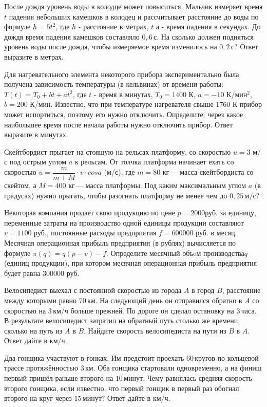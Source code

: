 \begin{listofex}
	\item После дождя уровень воды в колодце может повыситься. Мальчик измеряет время \( t \) падения небольших камешков в колодец и рассчитывает расстояние до воды по формуле \( h=5t^2 \), где \( h \) - расстояние в метрах, \( t \) а - время падения в секундах. До дождя время падения камешков составляло \( 0,6 \) с. На сколько должен подняться уровень воды после дождя, чтобы измеряемое время изменилось на \( 0,2 \) с? Ответ выразите в метрах.
	\item Для нагревательного элемента некоторого прибора экспериментально была получена зависимость температуры (в кельвинах) от времени работы: \( T(t) = T_0 + bt + at^2 \), где \( t \) - время в минутах, \( T_0 = 1400 \) К, \( a = -10 \) К/мин$^{2}$, \( b = 200 \) К/мин. Известно, что при температуре нагревателя свыше \( 1760 \) К прибор может испортиться, поэтому его нужно отключить. Определите, через какое наибольшее время после начала работы нужно отключить прибор. Ответ выразите в минутах.
	\item Скейтбордист прыгает на стоящую на рельсах платформу, со скоростью \(u = 3\)  м/с под острым углом \(a\) к рельсам. От толчка платформа начинает ехать со скоростью \(u = \dfrac{m}{m+M}\cdot v\cdot cos{a}\)  (м/с), где \(m = 80\) кг — масса скейтбордиста со скейтом, а \(M = 400\) кг — масса платформы. Под каким максимальным углом \(a\)  (в градусах) нужно прыгать, чтобы разогнать платформу не менее чем до \(0,25\) м/с?
	\item Некоторая компания продает свою продукцию по цене \(  p=2000  \)руб. за единицу, переменные затраты на производство одной единицы продукции составляют  \( v=1100 \) руб., постоянные расходы предприятия \( f=600000 \) руб. в месяц. Месячная операционная прибыль предприятия (в рублях) вычисляется по формуле  \( \pi(q)=q(p-v)-f \). Определите месячный объeм производства\(  q \) (единиц продукции), при котором месячная операционная прибыль предприятия будет равна \( 300000 \) руб.
	\item Велосипедист выехал с постоянной скоростью из города \(A\) в город \(B\), расстояние между которыми равно \(70\) км. На следующий день он отправился обратно в \(A\) со скоростью на \(3\) км/ч больше прежней. По дороге он сделал остановку на \(3\) часа. В результате велосипедист затратил на обратный путь столько же времени, сколько на путь из \(A\) в \(B\). Найдите скорость велосипедиста на пути из \(B\) в \(A\). Ответ дайте в км/ч.
	\item Два гонщика участвуют в гонках. Им предстоит проехать 60 кругов по кольцевой трассе протяжённостью \(3\) км. Оба гонщика стартовали одновременно, а на финиш первый пришёл раньше второго на \(10\) минут. Чему равнялась средняя скорость второго гонщика, если известно, что первый гонщик в первый раз обогнал второго на круг через \(15\) минут? Ответ дайте в км/ч.

\end{listofex}

